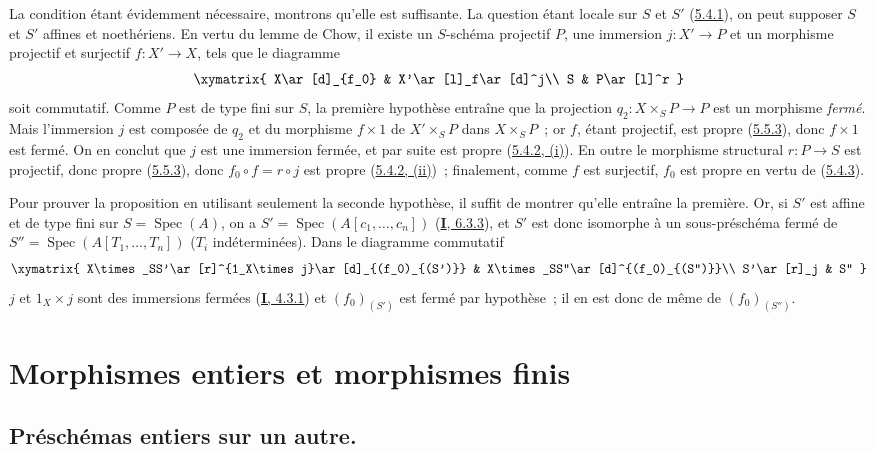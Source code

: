 La condition étant évidemment nécessaire, montrons qu'elle est suffisante.
La question étant locale sur $S$ et $S'$ (\hyperref[II.5.4.1-fr]{5.4.1}), on
peut supposer $S$ et $S'$ affines et noethériens. En vertu du lemme de Chow,
il existe un $S$-schéma projectif $P$, une immersion $j:X'\to P$ et un
morphisme projectif et surjectif $f:X'\to X$, tels que le diagramme
\[
\xymatrix{
X\ar[d]_{f_0} & X'\ar[l]_f\ar[d]^j\\
S & P\ar[l]^r
}
\]
soit commutatif. Comme $P$ est de type fini sur $S$, la première hypothèse
entraîne que la projection $q_2:X\times_SP\to P$ est un morphisme \emph{fermé}. Mais
l'immersion $j$ est composée de $q_2$ et du morphisme $f\times1$ de
$X'\times_SP$ dans $X\times_SP$~; or $f$, étant projectif, est propre
(\hyperref[II.5.5.3-fr]{5.5.3}), donc $f\times1$ est fermé. On en conclut que
$j$ est une immersion fermée, et par suite est propre
(\hyperref[II.5.4.2-fr]{5.4.2, (i)}). En outre le morphisme structural
$r:P\to S$ est projectif, donc propre (\hyperref[II.5.5.3-fr]{5.5.3}), donc
$f_0\circ f=r\circ j$ est propre
(\hyperref[II.5.4.2-fr]{5.4.2, (ii)})~; finalement, comme $f$ est surjectif,
$f_0$ est propre en vertu de (\hyperref[II.5.4.3-fr]{5.4.3}).

Pour prouver la proposition en utilisant seulement la seconde hypothèse, il
suffit de montrer qu'elle entraîne la première. Or, si $S'$ est affine et de
type fini sur $S=\operatorname{Spec}(A)$,
on a $S'=\operatorname{Spec}(A[c_1,\ldots,c_n])$
(\hyperref[I.6.3.3-fr]{\textbf{I}, 6.3.3}), et $S'$ est donc isomorphe à un
sous-préschéma fermé de $S''=\operatorname{Spec}(A[T_1,\ldots,T_n])$ ($T_i$
indéterminées). Dans le diagramme commutatif
\[
\xymatrix{
X\times_SS'\ar[r]^{1_X\times j}\ar[d]_{(f_0)_{(S')}} &
X\times_SS''\ar[d]^{(f_0)_{(S'')}}\\
S'\ar[r]_j & S''
}
\]
$j$ et $1_X\times j$ sont des immersions fermées
(\hyperref[I.4.3.1-fr]{\textbf{I}, 4.3.1}) et $(f_0)_{(S')}$ est fermé par hypothèse~;
il en est donc de même de $(f_0)_{(S'')}$. 

\section{Morphismes entiers et morphismes finis}
\label{section:II.6-fr}

\subsection{Préschémas entiers sur un autre.}
\label{subsection:II.6.1-fr}

